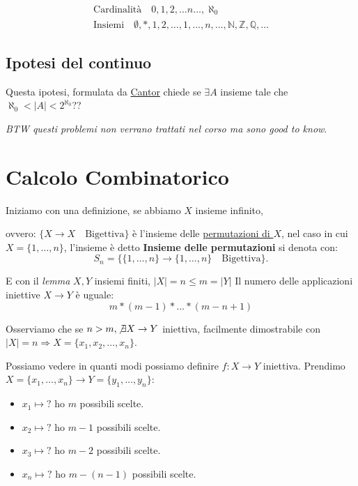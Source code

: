 \documentclass{article}
\begin{document}
\begin{align*}
        \mbox{Cardinalità} \quad 0,1,2,\ldots n\ldots,\aleph_0 \\
        \mbox{Insiemi} \quad \emptyset, {*}, {1,2}, \ldots, {1,\ldots,n},\ldots,\mathbb{N},\mathbb{Z},\mathbb{Q},\ldots        
\end{align*}


\subsection{Ipotesi del continuo}
Questa ipotesi, formulata da \underline{Cantor} chiede se $ \exists A$ insieme tale che $\aleph_0 < |A| < 2^{\aleph_0}$?? 

\textit{BTW questi problemi non verrano trattati nel corso ma sono good to know}.




\newpage
\section{Calcolo Combinatorico}

Iniziamo con una definizione, se abbiamo $X$ insieme infinito, \par ovvero: $\{X \to X \quad \mbox{Bigettiva}\}$ è l'insieme delle \underline{permutazioni di $X$}, nel caso in cui $X = \{1,\ldots, n\}$, l'insieme è detto \textbf{Insieme delle permutazioni} si denota con:
\begin{equation*}
        S_n = \{\{1,\ldots, n\} \to \{ 1,\ldots,n\} \quad \mbox{Bigettiva}\}.
\end{equation*}

E con il \textit{lemma} $X,Y$ insiemi finiti, $|X| = n \le m = |Y|$ Il numero delle applicazioni iniettive $X \to Y$ è uguale:
\begin{equation*}
        m * (m-1)*\ldots*(m-n+1)
\end{equation*}

Osserviamo che se $n > m, \not \exists X \to Y$ iniettiva, facilmente dimostrabile con $|X| = n \Rightarrow X = \{x_1,x_2,\ldots,x_n\}$. \par
Possiamo vedere in quanti modi possiamo definire $f:X \to Y$ iniettiva. 
Prendimo $X = \{x_1,\ldots,x_n\} \to Y = \{y_1,\ldots,y_n\}$:
\begin{itemize}
        \item $x_1 \mapsto \mbox{?}$ ho $m$ possibili scelte.
        \item $x_2 \mapsto \mbox{?}$ ho $m-1$ possibili scelte.
        \item $x_3 \mapsto \mbox{?}$ ho $m-2$ possibili scelte.
        \item $x_n \mapsto \mbox{?}$ ho $m-(n-1)$ possibili scelte.
\end{itemize}
\end{document}
